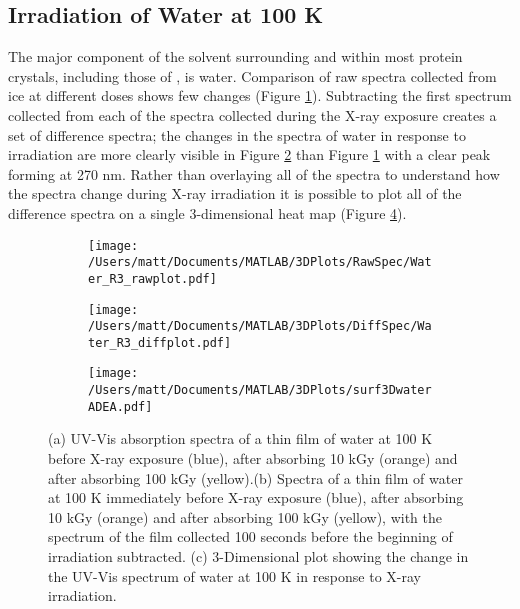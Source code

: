 \subsection{Irradiation of Water at 100 K}
The major component of the solvent surrounding and within most protein crystals, including those of \atpdx, is water. Comparison of raw spectra collected from ice at different doses shows few changes (Figure \ref{fig:water_norm}). Subtracting the first spectrum collected from each of the spectra collected during the X-ray exposure creates a set of difference spectra; the changes in the spectra of water in response to irradiation are more clearly visible in Figure \ref{fig:water_diff} than Figure \ref{fig:water_norm} with a clear peak forming at 270 nm. Rather than overlaying all of the spectra to understand how the spectra change during X-ray irradiation it is possible to plot all of the difference spectra on a single 3-dimensional heat map (Figure \ref{fig:water_heat}).\\            
\begin{figure}[!htbp]
\centering
\begin{subfigure}{.33\textwidth}
  \centering
  \texttt{[image: /Users/matt/Documents/MATLAB/3DPlots/RawSpec/Water\_R3\_rawplot.pdf]}
  \caption{}
  \label{fig:water_norm}
\end{subfigure}%
\begin{subfigure}{.33\textwidth}
  \centering
  \texttt{[image: /Users/matt/Documents/MATLAB/3DPlots/DiffSpec/Water\_R3\_diffplot.pdf]}
  \caption{}
  \label{fig:water_diff}
\end{subfigure}
\begin{subfigure}{.33\textwidth}
  \centering
  \texttt{[image: /Users/matt/Documents/MATLAB/3DPlots/surf3DwaterADEA.pdf]}
  \caption{}
  \label{fig:water_heat}
\end{subfigure}
\caption[UV-Vis Spectra of X-ray Irradiated Water at 100 K]{(a) UV-Vis absorption spectra of a thin film of water at 100 K before X-ray exposure (blue), after absorbing 10 \si{\kilo\gray} (orange) and after absorbing 100 \si{\kilo\gray} (yellow).(b) Spectra of a thin film of water at 100 K immediately before X-ray exposure (blue), after absorbing 10 \si{\kilo\gray} (orange) and after absorbing 100 \si{\kilo\gray} (yellow), with the spectrum of the film collected 100 seconds before the beginning of irradiation subtracted. (c) 3-Dimensional plot showing the change in the UV-Vis spectrum of water at 100 K in response to X-ray irradiation.}
\end{figure}

